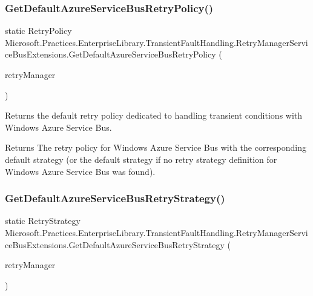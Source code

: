 \subsubsection{\texorpdfstring{Get\+Default\+Azure\+Service\+Bus\+Retry\+Policy()}{GetDefaultAzureServiceBusRetryPolicy()}}
{\footnotesize\ttfamily static Retry\+Policy Microsoft.\+Practices.\+Enterprise\+Library.\+Transient\+Fault\+Handling.\+Retry\+Manager\+Service\+Bus\+Extensions.\+Get\+Default\+Azure\+Service\+Bus\+Retry\+Policy (\begin{DoxyParamCaption}\item[{this Retry\+Manager}]{retry\+Manager }\end{DoxyParamCaption})\hspace{0.3cm}{\ttfamily [static]}}



Returns the default retry policy dedicated to handling transient conditions with Windows Azure Service Bus. 

\begin{DoxyReturn}{Returns}
The retry policy for Windows Azure Service Bus with the corresponding default strategy (or the default strategy if no retry strategy definition for Windows Azure Service Bus was found).
\end{DoxyReturn}
\mbox{\label{classMicrosoft_1_1Practices_1_1EnterpriseLibrary_1_1TransientFaultHandling_1_1RetryManagerServiceBusExtensions_a3e72201eeee2ca37a4a3e998039c25d4_a3e72201eeee2ca37a4a3e998039c25d4}} 
\subsubsection{\texorpdfstring{Get\+Default\+Azure\+Service\+Bus\+Retry\+Strategy()}{GetDefaultAzureServiceBusRetryStrategy()}}
{\footnotesize\ttfamily static Retry\+Strategy Microsoft.\+Practices.\+Enterprise\+Library.\+Transient\+Fault\+Handling.\+Retry\+Manager\+Service\+Bus\+Extensions.\+Get\+Default\+Azure\+Service\+Bus\+Retry\+Strategy (\begin{DoxyParamCaption}\item[{this Retry\+Manager}]{retry\+Manager }\end{DoxyParamCaption})\hspace{0.3cm}{\ttfamily [static]}}



